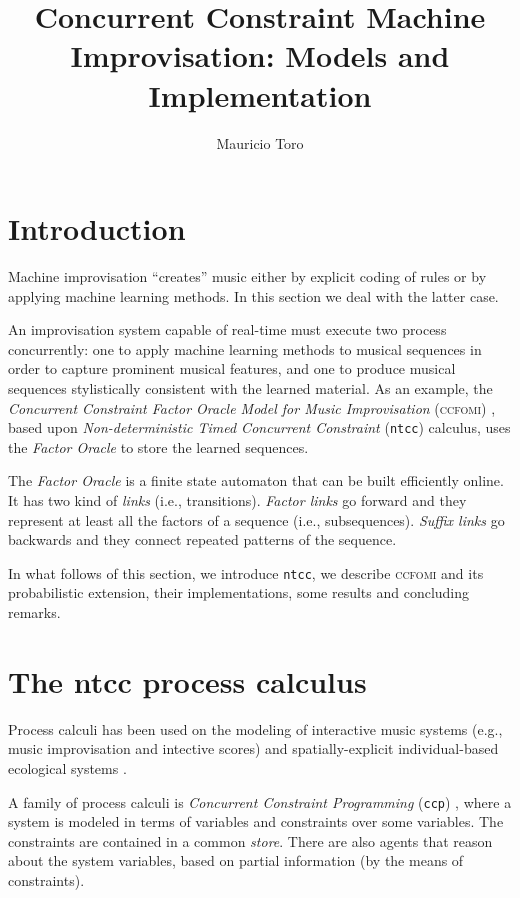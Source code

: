 \documentclass[english]{llncs}
\title{Concurrent Constraint Machine Improvisation: Models and Implementation}
\author{Mauricio Toro}
\institute{
Universidad Eafit 
}
\begin{document}
\maketitle
\section{Introduction}




Machine improvisation 
 ``creates'' music
 either by explicit coding of rules or
by applying machine learning
methods. In this section we deal with the latter case.

An improvisation system capable of real-time must execute two
process concurrently: one to apply machine learning methods to musical sequences in order to capture prominent musical features, 
 and one to produce musical sequences stylistically consistent with the learned material.
As an example, the \textit{Concurrent Constraint Factor Oracle Model for Music Improvisation} (\textsc{ccfomi}) \cite{rad06}, based upon \textit{Non-deterministic Timed Concurrent Constraint} (\texttt{ntcc}) calculus, uses the \textit{Factor Oracle} \cite{All99}  to store the
learned sequences. 

The \textit{Factor Oracle} is a finite state
automaton that can be built efficiently online. It has two kind of
\textit{links} (i.e., transitions). \textit{Factor links} go forward and they represent at least all the factors of a
sequence (i.e., subsequences). \textit{Suffix links} go backwards and they connect
repeated patterns of the sequence.

In what follows of this section, we introduce \texttt{ntcc}, we describe \textsc{ccfomi} and its probabilistic extension, their implementations, some results and concluding remarks.

\section{The ntcc process calculus}\label{sec:ntcc}
Process calculi has been used on the modeling of interactive music systems (e.g., music improvisation and intective scores)
 \cite{is-chapter,tdcr14,ntccrt,cc-chapter,torophd,torobsc,Toro-Bermudez10,Toro15,ArandaAOPRTV09,tdcc12,toro-report09,tdc10,tdcb10,tororeport} 
 and spatially-explicit individual-based ecological systems \cite{PT13,TPSK14,PTA13,mean-field-techreport}. 

A family of process calculi is \textit{Concurrent Constraint Programming} (\texttt{ccp}) \cite{cc-chapter}, where a system is modeled in terms of variables and constraints over some variables. The constraints are contained in a common \textit{store}. There are also agents that reason about the system variables, based on  partial information (by the means of constraints).
\end{document}
